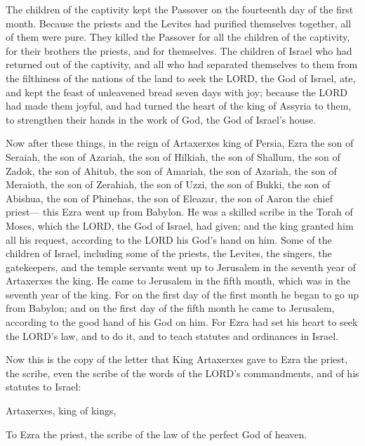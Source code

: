 \myverse{}The children of the captivity kept the Passover on the fourteenth
day of the first month.
\myverse{}Because the priests and the Levites had purified themselves together, all
of them were pure. They killed the Passover for all the children of the captivity, for their brothers
the priests, and for themselves.
\myverse{}The children of Israel who had returned out of the captivity, and all who
had separated themselves to them from the filthiness of the nations of the land to seek the LORD, the
God of Israel, ate,
\myverse{}and kept the feast of unleavened bread seven days with joy; because the LORD
had made them joyful, and had turned the heart of the king of Assyria to them, to strengthen their hands
in the work of God, the God of Israel’s house.


\mychapter{} \myverse*{}Now after these things, in the reign of Artaxerxes king of Persia,
Ezra the son of Seraiah, the son of Azariah, the son of Hilkiah,
\myverse{}the son of Shallum, the son of Zadok, the son of Ahitub,
\myverse{}the son of Amariah, the son of Azariah, the son of Meraioth,
\myverse{}the son of Zerahiah, the son of Uzzi, the son of Bukki,
\myverse{}the son of Abishua, the son of Phinehas, the son of Eleazar, the son of Aaron
the chief priest—
\myverse{}this Ezra went up from Babylon. He was a skilled scribe in the Torah of Moses,
which the LORD, the God of Israel, had given; and the king granted him all his request, according to the
LORD his God’s hand on him.
\myverse{}Some of the children of Israel, including some of the priests, the Levites,
the singers, the gatekeepers, and the temple servants went up to Jerusalem in the seventh year of Artaxerxes
the king.
\myverse{}He came to Jerusalem in the fifth month, which was in the seventh year of the
king.
\myverse{}For on the first day of the first month he began to go up from Babylon; and
on the first day of the fifth month he came to Jerusalem, according to the good hand of his God on him.
\myverse{}For Ezra had set his heart to seek the LORD’s law, and to do it, and to teach
statutes and ordinances in Israel.

\myverse{}Now this is the copy of the letter that King Artaxerxes gave
to Ezra the priest, the scribe, even the scribe of the words of the LORD’s commandments, and of his statutes
to Israel:


\vspace{\baselineskip} \myverse{}Artaxerxes, king of kings,

To Ezra the priest, the scribe of the law of the perfect God of heaven.

